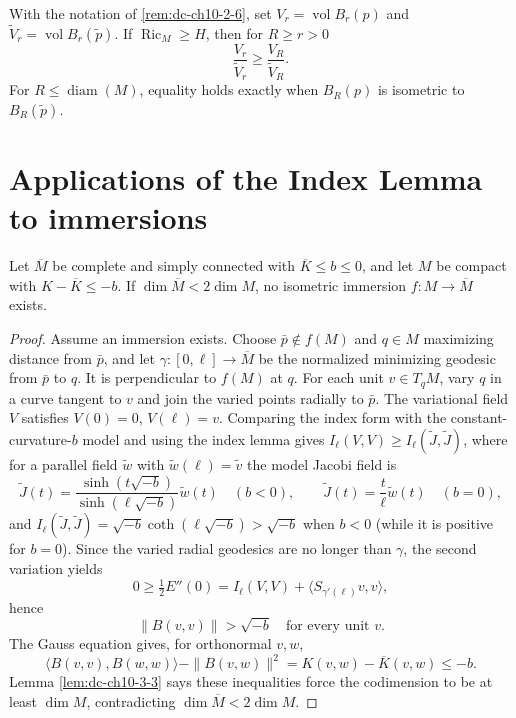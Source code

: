 \begin{remark}
  \label{rem:dc-ch10-2-7}
  With the notation of \cref{rem:dc-ch10-2-6}, set
  $V_r=\operatorname{vol}B_r(p)$ and $\widetilde V_r=\operatorname{vol}B_r(\tilde p)$.
  If $\operatorname{Ric}_M\geq H$, then for $R\geq r>0$
  \[
  \frac{V_r}{\widetilde V_r}\geq\frac{V_R}{\widetilde V_R}.
  \]
  For $R\leq\operatorname{diam}(M)$, equality holds exactly when
  $B_R(p)$ is isometric to $B_R(\tilde p)$.
\end{remark}

\section{Applications of the Index Lemma to immersions}

\begin{theorem}
  \label{thm:dc-ch10-3-1}
  Let $\overline M$ be complete and simply connected with
  $\overline K\leq b\leq0$, and let $M$ be compact with
  $K-\overline K\leq-b$. If $\dim\overline M<2\dim M$, no isometric immersion
  $f:M\to\overline M$ exists.
\end{theorem}
\begin{proof}
  \sketch
  Assume an immersion exists. Choose $\bar p\notin f(M)$ and $q\in M$ maximizing
  distance from $\bar p$, and let $\gamma:[0,\ell]\to\overline M$ be the normalized
  minimizing geodesic from $\bar p$ to $q$. It is perpendicular to $f(M)$ at $q$.
  For each unit $v\in T_qM$, vary $q$ in a curve tangent to $v$ and join the varied
  points radially to $\bar p$. The variational field $V$ satisfies $V(0)=0$, $V(\ell)=v$.
  Comparing the index form with the constant-curvature-$b$ model and using the index
  lemma gives $I_\ell(V,V)\geq I_\ell(\tilde J,\tilde J)$, where for a parallel field
  $\tilde w$ with $\tilde w(\ell)=\tilde v$ the model Jacobi field is
  \[
  \tilde J(t)=\frac{\sinh(t\sqrt{-b})}{\sinh(\ell\sqrt{-b})}\tilde w(t)\quad(b<0),
  \qquad \tilde J(t)=\frac{t}{\ell}\tilde w(t)\quad(b=0),
  \]
  and $I_\ell(\tilde J,\tilde J)=\sqrt{-b}\coth(\ell\sqrt{-b})>\sqrt{-b}$
  when $b<0$ (while it is positive for $b=0$). Since the
  varied radial geodesics are no longer than $\gamma$, the second variation yields
  \[
  0\geq\tfrac12E''(0)=I_\ell(V,V)+
  \langle S_{\gamma'(\ell)}v,v\rangle,
  \]
  hence
  \[
  \|B(v,v)\|>\sqrt{-b}\quad\text{for every unit }v. \tag{6}
  \]
  The Gauss equation gives, for orthonormal $v,w$,
  \[
  \langle B(v,v),B(w,w)\rangle-\|B(v,w)\|^2
  =K(v,w)-\overline K(v,w)\leq-b. \tag{7}
  \]
  Lemma \cref{lem:dc-ch10-3-3} says these inequalities force the codimension to be
  at least $\dim M$, contradicting $\dim\overline M<2\dim M$.
\end{proof}


